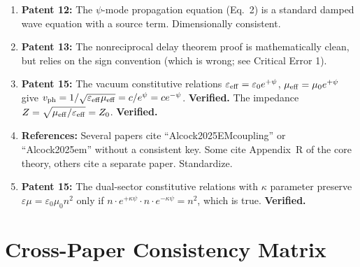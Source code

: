 \documentclass[12pt,a4paper]{article}
\begin{document}
\begin{enumerate}[label=MN-\arabic*.]
\item \textbf{Patent 12:} The $\psi$-mode propagation equation
(Eq.~2) is a standard damped wave equation with a source term.
Dimensionally consistent.

\item \textbf{Patent 13:} The nonreciprocal delay theorem proof
is mathematically clean, but relies on the sign convention (which
is wrong; see Critical Error 1).

\item \textbf{Patent 15:} The vacuum constitutive relations
$\varepsilon_{\rm eff} = \varepsilon_0 e^{+\psi}$,
$\mu_{\rm eff} = \mu_0 e^{+\psi}$ give
$v_{\rm ph} = 1/\sqrt{\varepsilon_{\rm eff}\mu_{\rm eff}}
= c/e^{\psi} = ce^{-\psi}$. \textbf{Verified.} The impedance
$Z = \sqrt{\mu_{\rm eff}/\varepsilon_{\rm eff}} = Z_0$.
\textbf{Verified.}

\item \textbf{References:} Several papers cite ``Alcock2025EMcoupling''
or ``Alcock2025em'' without a consistent key. Some cite Appendix~R of the
core theory, others cite a separate paper. Standardize.

\item \textbf{Patent 15:} The dual-sector constitutive relations
with $\kappa$ parameter preserve $\varepsilon\mu = \varepsilon_0\mu_0 n^2$
only if $n \cdot e^{+\kappa\psi} \cdot n \cdot e^{-\kappa\psi}
= n^2$, which is true. \textbf{Verified.}

\end{enumerate}

\section{Cross-Paper Consistency Matrix}
\label{sec:matrix}
\end{document}
